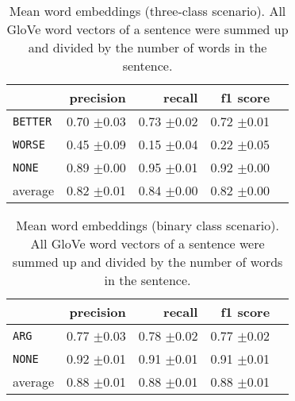 	\begin{table}[htbp] 
		\centering 
		\caption{Mean word embeddings (three-class scenario). All GloVe word vectors of a sentence were summed up and divided by the number of words in the sentence.} 
		\label{  }
		\begin{tabular}{@{}lrrrr@{}}
			\toprule
			        & precision                & recall                   & f1 score                 \\ \midrule 
\texttt	{BETTER}	&	 0.70 \scriptsize{$\pm$0.03} &	 0.73 \scriptsize{$\pm$0.02} &	 0.72 \scriptsize{$\pm$0.01}  \\ 
\texttt	{WORSE}	&	 0.45 \scriptsize{$\pm$0.09} &	 0.15 \scriptsize{$\pm$0.04} &	 0.22 \scriptsize{$\pm$0.05}  \\ 
\texttt	{NONE}	&	 0.89 \scriptsize{$\pm$0.00} &	 0.95 \scriptsize{$\pm$0.01} &	 0.92 \scriptsize{$\pm$0.00}  \\ 
average	&	 0.82 \scriptsize{$\pm$0.01} &	 0.84 \scriptsize{$\pm$0.00} &	 0.82 \scriptsize{$\pm$0.00}  \\ 
			\bottomrule
		\end{tabular}
	\end{table}
	
	\begin{table}[htbp] 
		\centering 
		\caption{Mean word embeddings (binary class scenario). All GloVe word vectors of a sentence were summed up and divided by the number of words in the sentence.} 
		\label{  }
		\begin{tabular}{@{}lrrrr@{}}
			\toprule
			        & precision                & recall                   & f1 score                 \\ \midrule 
	\texttt{ARG}	&	 0.77 \scriptsize{$\pm$0.03} &	 0.78 \scriptsize{$\pm$0.02} &	 0.77 \scriptsize{$\pm$0.02}  \\ 
	\texttt{NONE}	&	 0.92 \scriptsize{$\pm$0.01} &	 0.91 \scriptsize{$\pm$0.01} &	 0.91 \scriptsize{$\pm$0.01}  \\ 
average	&	 0.88 \scriptsize{$\pm$0.01} &	 0.88 \scriptsize{$\pm$0.01} &	 0.88 \scriptsize{$\pm$0.01}  \\ 
			\bottomrule
		\end{tabular}
	\end{table}
	
